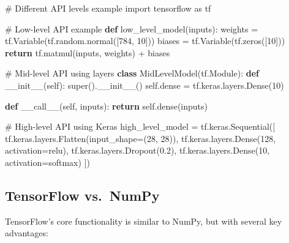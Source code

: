 \documentclass[
  letterpaper,
  DIV=11,
  numbers=noendperiod]{scrreprt}
\newenvironment{Shaded}{\begin{snugshade}}{\end{snugshade}}
\newcommand{\BuiltInTok}[1]{\textcolor[rgb]{0.00,0.23,0.31}{#1}}
\newcommand{\CommentTok}[1]{\textcolor[rgb]{0.37,0.37,0.37}{#1}}
\newcommand{\ControlFlowTok}[1]{\textcolor[rgb]{0.00,0.23,0.31}{\textbf{#1}}}
\newcommand{\DecValTok}[1]{\textcolor[rgb]{0.68,0.00,0.00}{#1}}
\newcommand{\FloatTok}[1]{\textcolor[rgb]{0.68,0.00,0.00}{#1}}
\newcommand{\FunctionTok}[1]{\textcolor[rgb]{0.28,0.35,0.67}{#1}}
\newcommand{\ImportTok}[1]{\textcolor[rgb]{0.00,0.46,0.62}{#1}}
\newcommand{\KeywordTok}[1]{\textcolor[rgb]{0.00,0.23,0.31}{\textbf{#1}}}
\newcommand{\NormalTok}[1]{\textcolor[rgb]{0.00,0.23,0.31}{#1}}
\newcommand{\OperatorTok}[1]{\textcolor[rgb]{0.37,0.37,0.37}{#1}}
\newcommand{\StringTok}[1]{\textcolor[rgb]{0.13,0.47,0.30}{#1}}
\newcommand{\VariableTok}[1]{\textcolor[rgb]{0.07,0.07,0.07}{#1}}
\begin{document}
\begin{Shaded}
\begin{Highlighting}[]
\CommentTok{\# Different API levels example}
\ImportTok{import}\NormalTok{ tensorflow }\ImportTok{as}\NormalTok{ tf}

\CommentTok{\# Low{-}level API example}
\KeywordTok{def}\NormalTok{ low\_level\_model(inputs):}
\NormalTok{    weights }\OperatorTok{=}\NormalTok{ tf.Variable(tf.random.normal([}\DecValTok{784}\NormalTok{, }\DecValTok{10}\NormalTok{]))}
\NormalTok{    biases }\OperatorTok{=}\NormalTok{ tf.Variable(tf.zeros([}\DecValTok{10}\NormalTok{]))}
    \ControlFlowTok{return}\NormalTok{ tf.matmul(inputs, weights) }\OperatorTok{+}\NormalTok{ biases}

\CommentTok{\# Mid{-}level API using layers}
\KeywordTok{class}\NormalTok{ MidLevelModel(tf.Module):}
    \KeywordTok{def} \FunctionTok{\_\_init\_\_}\NormalTok{(}\VariableTok{self}\NormalTok{):}
        \BuiltInTok{super}\NormalTok{().}\FunctionTok{\_\_init\_\_}\NormalTok{()}
        \VariableTok{self}\NormalTok{.dense }\OperatorTok{=}\NormalTok{ tf.keras.layers.Dense(}\DecValTok{10}\NormalTok{)}
    
    \KeywordTok{def} \FunctionTok{\_\_call\_\_}\NormalTok{(}\VariableTok{self}\NormalTok{, inputs):}
        \ControlFlowTok{return} \VariableTok{self}\NormalTok{.dense(inputs)}

\CommentTok{\# High{-}level API using Keras}
\NormalTok{high\_level\_model }\OperatorTok{=}\NormalTok{ tf.keras.Sequential([}
\NormalTok{    tf.keras.layers.Flatten(input\_shape}\OperatorTok{=}\NormalTok{(}\DecValTok{28}\NormalTok{, }\DecValTok{28}\NormalTok{)),}
\NormalTok{    tf.keras.layers.Dense(}\DecValTok{128}\NormalTok{, activation}\OperatorTok{=}\StringTok{\textquotesingle{}relu\textquotesingle{}}\NormalTok{),}
\NormalTok{    tf.keras.layers.Dropout(}\FloatTok{0.2}\NormalTok{),}
\NormalTok{    tf.keras.layers.Dense(}\DecValTok{10}\NormalTok{, activation}\OperatorTok{=}\StringTok{\textquotesingle{}softmax\textquotesingle{}}\NormalTok{)}
\NormalTok{])}
\end{Highlighting}
\end{Shaded}

\subsection{TensorFlow vs.~NumPy}\label{tensorflow-vs.-numpy}

TensorFlow's core functionality is similar to NumPy, but with several
key advantages:
\end{document}
